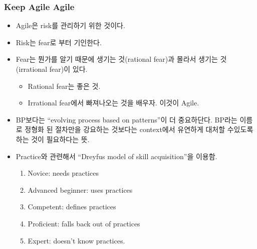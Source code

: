 \begin{frame}
\frametitle{Keep Agile Agile}

\begin{itemize}
\item Agile은 risk를 관리하기 위한 것이다.
\item Risk는 fear로 부터 기인한다.
\item Fear는 뭔가를 알기 때문에 생기는 것(rational fear)과 몰라서 생기는 
것(irrational fear)이 있다.
    \begin{itemize}
    \item Rational fear는 좋은 것.
    \item Irrational fear에서 빠져나오는 것을 배우자. 이것이 Agile.
    \end{itemize}
\item BP보다는 ``evolving process based on patterns''이 더 중요하단다.
    BP라는 이름로 정형화 된 절차만을 강요하는 것보다는 context에서 
    유연하게 대처할 수있도록 하는 것이 필요하다는 뜻.
\item Practice와 관련해서 ``Dreyfus model of skill acquisition''을 이용함.
    \begin{enumerate}
    \item Novice: needs practices
    \item Advanced beginner: uses practices
    \item Competent: defines practices
    \item Proficient: falls back out of practices
    \item Expert: doesn't know practices.
    \end{enumerate}
\end{itemize}
\end{frame}

